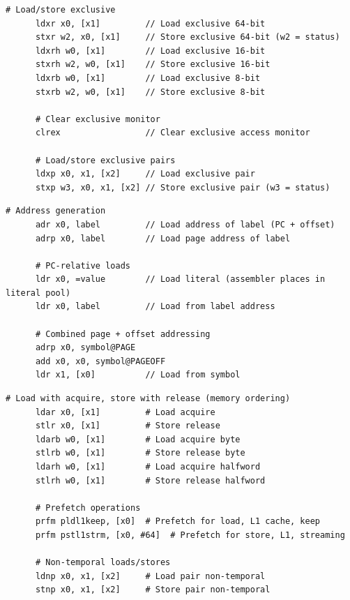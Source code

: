   \begin{definition}
    \label{def:atomic-and-exclusive-operations}
    \begin{lstlisting}[language=arm]
      # Load/store exclusive
      ldxr x0, [x1]         // Load exclusive 64-bit
      stxr w2, x0, [x1]     // Store exclusive 64-bit (w2 = status)
      ldxrh w0, [x1]        // Load exclusive 16-bit
      stxrh w2, w0, [x1]    // Store exclusive 16-bit
      ldxrb w0, [x1]        // Load exclusive 8-bit
      stxrb w2, w0, [x1]    // Store exclusive 8-bit
      
      # Clear exclusive monitor
      clrex                 // Clear exclusive access monitor
      
      # Load/store exclusive pairs
      ldxp x0, x1, [x2]     // Load exclusive pair
      stxp w3, x0, x1, [x2] // Store exclusive pair (w3 = status)
    \end{lstlisting}
  \end{definition}

  \begin{definition}
    \label{def:pc-relative-addressing}
    \begin{lstlisting}[language=arm]
      # Address generation
      adr x0, label         // Load address of label (PC + offset)
      adrp x0, label        // Load page address of label
      
      # PC-relative loads
      ldr x0, =value        // Load literal (assembler places in literal pool)
      ldr x0, label         // Load from label address
      
      # Combined page + offset addressing
      adrp x0, symbol@PAGE
      add x0, x0, symbol@PAGEOFF
      ldr x1, [x0]          // Load from symbol
    \end{lstlisting}
  \end{definition}

  \begin{definition}
    \label{def:advanced-load-store}
    \begin{lstlisting}[language=arm]
      # Load with acquire, store with release (memory ordering)
      ldar x0, [x1]         # Load acquire
      stlr x0, [x1]         # Store release
      ldarb w0, [x1]        # Load acquire byte
      stlrb w0, [x1]        # Store release byte
      ldarh w0, [x1]        # Load acquire halfword
      stlrh w0, [x1]        # Store release halfword
      
      # Prefetch operations
      prfm pldl1keep, [x0]  # Prefetch for load, L1 cache, keep
      prfm pstl1strm, [x0, #64]  # Prefetch for store, L1, streaming
      
      # Non-temporal loads/stores
      ldnp x0, x1, [x2]     # Load pair non-temporal
      stnp x0, x1, [x2]     # Store pair non-temporal
    \end{lstlisting}
  \end{definition}

